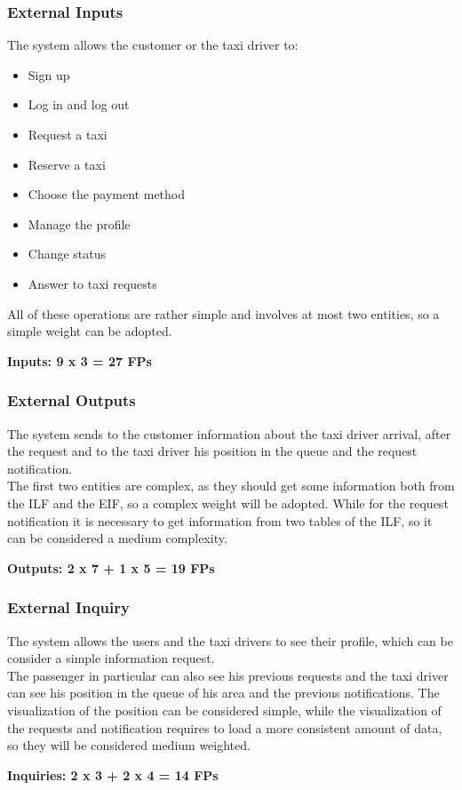 		\subsubsection{External Inputs}
			The system allows the customer or the taxi driver to:
			\begin{itemize}
				 \item Sign up
				 \item Log in and log out
				 \item Request a taxi
				 \item Reserve a taxi
				 \item Choose the payment method
				 \item Manage the profile
				 \item Change status
				 \item Answer to taxi requests
			\end{itemize}
			All of these operations are rather simple and involves at most two entities, so a simple weight can be adopted.
			\begin{center}
				\textbf{Inputs: 9 x 3 = 27 FPs}
			\end{center}
		\subsubsection{External Outputs}
			The system sends to the customer information about the taxi driver arrival, after the request and to the taxi driver his position in the queue and the request notification.\\
			The first two entities are complex, as they should get some information both from the ILF and the EIF, so a complex weight will be adopted. While for the request notification it is necessary to get information from two tables of the ILF, so it can be considered a medium complexity.
			\begin{center}
				\textbf{Outputs: 2 x 7 + 1 x 5 = 19 FPs}
			\end{center}
		\subsubsection{External Inquiry}
			The system allows the users and the taxi drivers to see their profile, which can be consider a simple information request.\\The passenger in particular can also see his previous requests and the taxi driver can see his position in the queue of his area and the previous notifications. The visualization of the position can be considered simple, while the visualization of the requests and notification requires to load a more consistent amount of data, so they will be considered medium weighted.
			\begin{center}
				\textbf{Inquiries: 2 x 3 + 2 x 4 = 14 FPs}
			\end{center}
		\newpage
